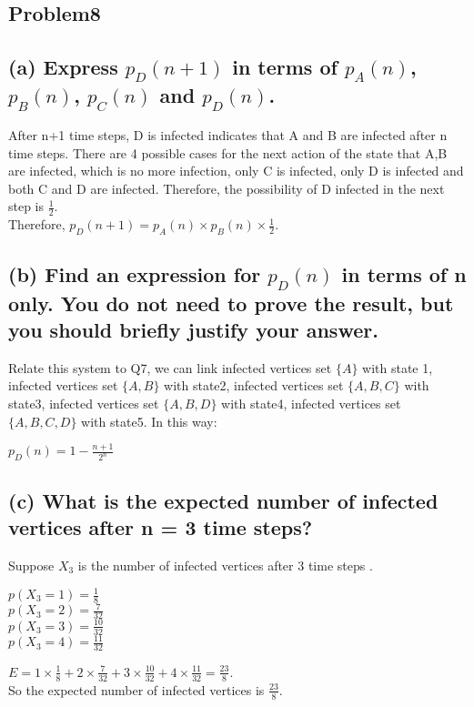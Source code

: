 \documentclass[]{article}
\begin{document}
\begin{spacing}{1.5}
	\section*{Problem8}
	\subsection*{(a) Express $ p_D(n + 1) $ in terms of $  p_A(n) $, $ p_B(n) $, $ p_C(n) $ and $ p_D(n) $.}
	After n+1 time steps, D is infected indicates that A and B are infected after n time steps. There are 4 possible cases for the next action of the state that A,B are infected, which is no more infection, only C is infected, only D is infected and both C and D are infected. Therefore, the possibility of D infected in the next step is $ \frac{1}{2} $.\\
	Therefore, $  p_D(n+1) = p_A(n) \times p_B(n) \times \frac{1}{2}$.
	
	\subsection*{(b) Find an expression for $ p_D(n) $ in terms of n only. You do not need to prove the result, but you should briefly justify your answer.}
	Relate this system to Q7, we can link infected vertices set $  \{A\}  $ with state 1,  infected vertices set $ \{A, B\} $ with state2,  infected vertices set $ \{A, B, C\} $ with state3,  infected vertices set $ \{A, B, D\} $ with state4,  infected vertices set $ \{A, B, C, D\} $  with state5. In this way:
	\begin{center}
			$  p_D(n) = 1 - \frac{n+1}{2^n} $
	\end{center}
	
	\subsection*{(c) What is the expected number of infected vertices after n = 3 time steps?}
	Suppose $ X_3 $ is the number of infected vertices after 3 time steps  .
	\begin{center}
		$ p(X_3=1) = \frac{1}{8} $\\
		$ p(X_3=2) = \frac{7}{32} $\\
		$ p(X_3=3) = \frac{10}{32} $\\
		$ p(X_3=4) = \frac{11}{32} $
	\end{center}
	$ E = 1 \times \frac{1}{8} + 2 \times \frac{7}{32} + 3 \times  \frac{10}{32} + 4 \times \frac{11}{32} = \frac{23}{8} $.\\
	So the expected number of infected vertices is $ \frac{23}{8} $.
	
	\end{spacing}
\end{document}

